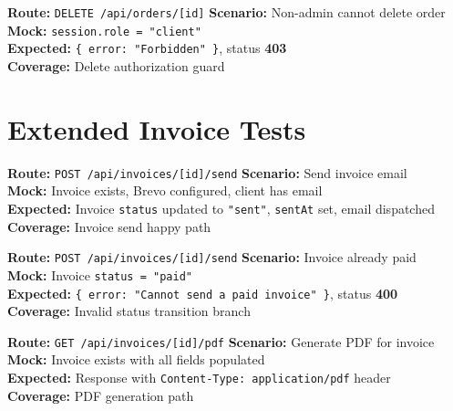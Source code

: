 ﻿\documentclass[12pt,a4paper]{report}
\newcommand{\pone}{\textbf{\color{p1red}P1}}
\newcommand{\ptwo}{\textbf{\color{p2orange}P2}}
\begin{document}
\begin{tcolorbox}[testbox,title={ORD-020 \hfill \pone}]
\textbf{Route:} \texttt{DELETE /api/orders/[id]} \quad \textbf{Scenario:} Non-admin cannot delete order \\
\textbf{Mock:} \texttt{session.role = "client"} \\
\textbf{Expected:} \texttt{\{ error: "Forbidden" \}}, status \textbf{403} \\
\textbf{Coverage:} Delete authorization guard
\end{tcolorbox}

\section{Extended Invoice Tests}

\begin{tcolorbox}[testbox,title={INV-016 \hfill \ptwo}]
\textbf{Route:} \texttt{POST /api/invoices/[id]/send} \quad \textbf{Scenario:} Send invoice email \\
\textbf{Mock:} Invoice exists, Brevo configured, client has email \\
\textbf{Expected:} Invoice \texttt{status} updated to \texttt{"sent"}, \texttt{sentAt} set, email dispatched \\
\textbf{Coverage:} Invoice send happy path
\end{tcolorbox}

\begin{tcolorbox}[testbox,title={INV-017 \hfill \ptwo}]
\textbf{Route:} \texttt{POST /api/invoices/[id]/send} \quad \textbf{Scenario:} Invoice already paid \\
\textbf{Mock:} Invoice \texttt{status = "paid"} \\
\textbf{Expected:} \texttt{\{ error: "Cannot send a paid invoice" \}}, status \textbf{400} \\
\textbf{Coverage:} Invalid status transition branch
\end{tcolorbox}

\begin{tcolorbox}[testbox,title={INV-018 \hfill \ptwo}]
\textbf{Route:} \texttt{GET /api/invoices/[id]/pdf} \quad \textbf{Scenario:} Generate PDF for invoice \\
\textbf{Mock:} Invoice exists with all fields populated \\
\textbf{Expected:} Response with \texttt{Content-Type: application/pdf} header \\
\textbf{Coverage:} PDF generation path
\end{tcolorbox}
\end{document}
